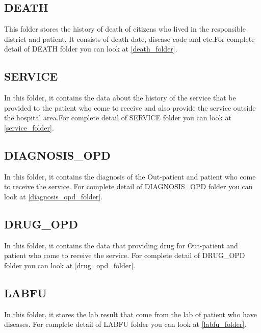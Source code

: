         
    \subsection{DEATH}
        This folder stores the history of death of citizens who lived in the responsible district and patient. It consists of death date, disease code and etc.For complete detail of DEATH folder you can look at \ref{death_folder}.
        
    \subsection{SERVICE}
        In this folder, it contains the data about the history of the service that be provided to the patient who come to receive and also provide the service outside the hospital area.For complete detail of SERVICE folder you can look at \ref{service_folder}.
        
    \subsection{DIAGNOSIS\_OPD}
        In this folder, it contains the diagnosis of the Out-patient and patient who come to receive the service. For complete detail of DIAGNOSIS\_OPD folder you can look at \ref{diagnosis_opd_folder}.
        
    \subsection{DRUG\_OPD}
        In this folder, it contains the data that providing drug for Out-patient and patient who come to receive the service. For complete detail of DRUG\_OPD folder you can look at \ref{drug_opd_folder}.
        
    \subsection{LABFU}
        In this folder, it stores the  lab result that come from the lab of patient who have diseases. For complete detail of LABFU folder you can look at \ref{labfu_folder}.


